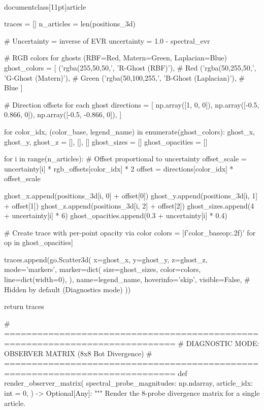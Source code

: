 \\documentclass[11pt]{article}
\begin{document}
\begin{CodeBlock}
{{    traces = []
    n_articles = len(positions_3d)

    # Uncertainty = inverse of EVR
    uncertainty = 1.0 - spectral_evr

    # RGB colors for ghosts (RBF=Red, Matern=Green, Laplacian=Blue)
    ghost_colors = [
        ('rgba(255,50,50,', 'R-Ghost (RBF)'),      # Red
        ('rgba(50,255,50,', 'G-Ghost (Matern)'),   # Green
        ('rgba(50,100,255,', 'B-Ghost (Laplacian)'),  # Blue
    ]

    # Direction offsets for each ghost
    directions = [
        np.array([1, 0, 0]),
        np.array([-0.5, 0.866, 0]),
        np.array([-0.5, -0.866, 0]),
    ]

    for color_idx, (color_base, legend_name) in enumerate(ghost_colors):
        ghost_x, ghost_y, ghost_z = [], [], []
        ghost_sizes = []
        ghost_opacities = []

        for i in range(n_articles):
            # Offset proportional to uncertainty
            offset_scale = uncertainty[i] * rgb_offsets[color_idx] * 2
            offset = directions[color_idx] * offset_scale

            ghost_x.append(positions_3d[i, 0] + offset[0])
            ghost_y.append(positions_3d[i, 1] + offset[1])
            ghost_z.append(positions_3d[i, 2] + offset[2])
            ghost_sizes.append(4 + uncertainty[i] * 6)
            ghost_opacities.append(0.3 + uncertainty[i] * 0.4)

        # Create trace with per-point opacity via color
        colors = [f'{color_base}{op:.2f})' for op in ghost_opacities]

        traces.append(go.Scatter3d(
            x=ghost_x, y=ghost_y, z=ghost_z,
            mode='markers',
            marker=dict(
                size=ghost_sizes,
                color=colors,
                line=dict(width=0),
            ),
            name=legend_name,
            hoverinfo='skip',
            visible=False,  # Hidden by default (Diagnostics mode)
        ))

    return traces


# =============================================================================
# DIAGNOSTIC MODE: OBSERVER MATRIX (8x8 Bot Divergence)
# =============================================================================
def render_observer_matrix(
    spectral_probe_magnitudes: np.ndarray,
    article_idx: int = 0,
) -> Optional[Any]:
    """
    Render the 8-probe divergence matrix for a single article.

}}
\end{CodeBlock}
\end{document}
